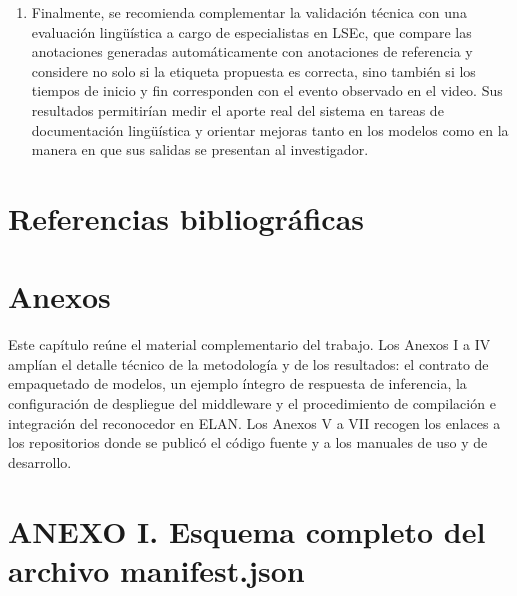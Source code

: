\documentclass[11pt,a4paper]{article}
\begin{document}
\begin{enumerate}
    \item Finalmente, se recomienda complementar la validación técnica con una evaluación lingüística a cargo de especialistas en LSEc, que compare las anotaciones generadas automáticamente con anotaciones de referencia y considere no solo si la etiqueta propuesta es correcta, sino también si los tiempos de inicio y fin corresponden con el evento observado en el video. Sus resultados permitirían medir el aporte real del sistema en tareas de documentación lingüística y orientar mejoras tanto en los modelos como en la manera en que sus salidas se presentan al investigador.
\end{enumerate}

\section[REFERENCIAS BIBLIOGRÁFICAS]{Referencias bibliográficas}
\nocite{*}
\printbibliography[heading=none]

\clearpage
\section[ANEXOS]{Anexos}

Este capítulo reúne el material complementario del trabajo. Los Anexos I a IV amplían el detalle técnico de la metodología y de los resultados: el contrato de empaquetado de modelos, un ejemplo íntegro de respuesta de inferencia, la configuración de despliegue del middleware y el procedimiento de compilación e integración del reconocedor en ELAN. Los Anexos V a VII recogen los enlaces a los repositorios donde se publicó el código fuente y a los manuales de uso y de desarrollo.

\section*{\normalfont ANEXO I. Esquema completo del archivo manifest.json}
\label{anx:manifest_schema}
\end{document}
